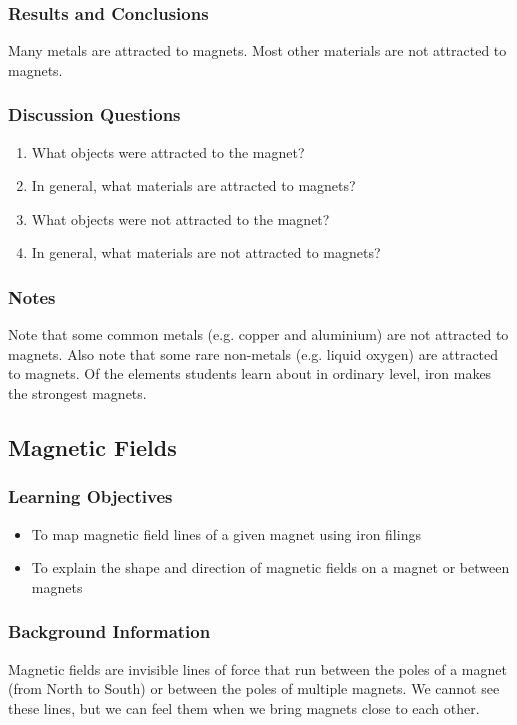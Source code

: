 \subsubsection*{Results and Conclusions}
Many metals are attracted to magnets. Most other materials are not attracted to magnets.


\subsubsection*{Discussion Questions}
\begin{enumerate}
\item{What objects were attracted to the magnet?}
\item{In general, what materials are attracted to magnets?}
\item{What objects were not attracted to the magnet?}
\item{In general, what materials are not attracted to magnets?}
\end{enumerate}

\subsubsection*{Notes}
Note that some common metals (e.g. copper and aluminium) are not attracted to magnets. Also note that some rare non-metals (e.g. liquid oxygen) are attracted to magnets. Of the elements students learn about in ordinary level, iron makes the strongest magnets.

\subsection{Magnetic Fields}

\subsubsection*{Learning Objectives}
\begin{itemize}
\item{To map magnetic field lines of a given magnet using iron filings}
\item{To explain the shape and direction of magnetic fields on a magnet or between magnets}
\end{itemize}

\subsubsection*{Background Information}
Magnetic fields are invisible lines of force that run between the poles of a magnet (from North to South) or between the poles of multiple magnets.  We cannot see these lines, but we can feel them when we bring magnets close to each other.

